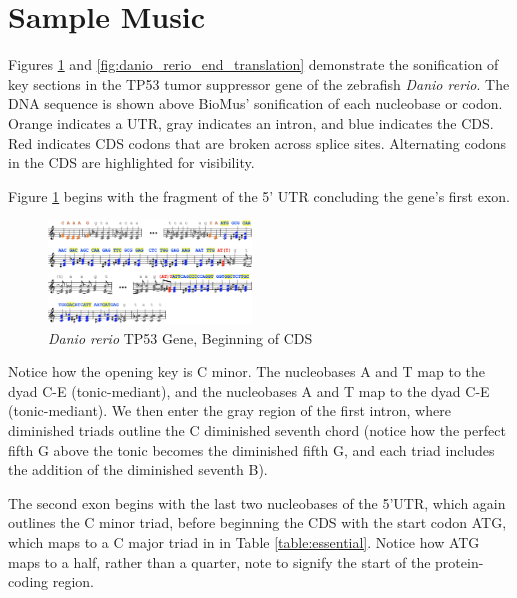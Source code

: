 \documentclass[letterpaper]{article}
\begin{document}
\section{Sample Music}

Figures \ref{fig:danio_rerio_start_translation} and \ref{fig:danio_rerio_end_translation} demonstrate the sonification of key sections in the TP53 tumor suppressor gene of the zebrafish \textit{Danio rerio}. The DNA sequence is shown above BioMus' sonification of each nucleobase or codon. Orange indicates a UTR, gray indicates an intron, and blue indicates the CDS. Red indicates CDS codons that are broken across splice sites. Alternating codons in the CDS are highlighted for visibility.

Figure \ref{fig:danio_rerio_start_translation} begins with the fragment of the 5' UTR concluding the gene's first exon. 

\begin{figure}[h!]
\centering
\includegraphics[width=0.48\textwidth]{images/danio_rerio_start_translation}
\vspace{-3mm}
  \caption{\textit{Danio rerio} TP53 Gene, Beginning of CDS}
  \label{fig:danio_rerio_start_translation}
  \vspace{-3mm}
\end{figure}

Notice how the opening key is C minor. The nucleobases A and T map to the dyad C-E\musFlat \; (tonic-mediant), and the nucleobases A and T map to the dyad C-E\musFlat \; (tonic-mediant). We then enter the gray region of the first intron, where diminished triads outline the C diminished seventh chord (notice how the perfect fifth G above the tonic becomes the diminished fifth G\musFlat, and each triad includes the addition of the diminished seventh B\musDoubleFlat). 

The second exon begins with the last two nucleobases of the 5'UTR, which again outlines the C minor triad, before beginning the CDS with the start codon ATG, which maps to a C major triad in in Table \ref{table:essential}. Notice how ATG maps to a half, rather than a quarter, note to signify the start of the protein-coding region.
\end{document}
